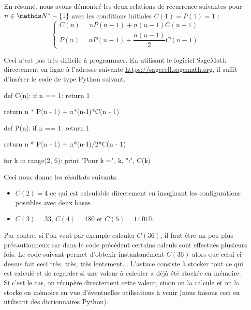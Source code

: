 En résumé, nous avons démontré les deux relations de récurrence suivantes pour $n \in \NN^* - \{1\}$ avec les conditions initiales $C(1) = P(1) = 1$ :
\begin{equation}
	\begin{cases}
		C(n) = n P(n - 1) + n(n-1) C(n-1) \\
		P(n) = n P(n - 1) + \dfrac{n(n-1)}{2} C(n - 1)
	\end{cases}
\end{equation}


\medskip

Ceci n'est pas très difficile à programmer. En utilisant le logiciel SageMath directement en ligne à l'adresse suivante \url{https://sagecell.sagemath.org}, il suffit d'insérer le code de type Python suivant.


\bigskip

\begin{myverb}
def C(n):
    if n == 1:
        return 1
        
    return n * P(n - 1) + n*(n-1)*C(n - 1)


def P(n):
    if n == 1:
        return 1
        
    return n * P(n - 1) + n*(n-1)/2*C(n - 1)

       
for k in range(2, 6):
    print "Pour k =", k, ":", C(k)

\end{myverb}

\bigskip

Ceci nous donne les résultats suivants.

\medskip

\begin{itemize}
    \item[\textbullet] $C(2) = 4$ ce qui est calculable directement en imaginant les configurations possibles avec deux bases.

    \medskip

    \item[\textbullet] $C(3) = 33$,
                       $C(4) = 480$ et
                       $C(5) = 11\,010$.
\end{itemize}


\medskip

Par contre, si l'on veut par exemple calculer $C(36)$, il faut être un peu plus précautionneux car dans le code précédent certains calculs sont effectués plusieurs fois. Le code suivant permet d'obtenir instantanément $C(36)$ alors que celui ci-dessus fait ceci très, très, très lentement... L'astuce consiste à stocker tout ce qui est calculé et de regarder si une valeur à calculer a déjà été stockée en mémoire. Si c'est le cas, on récupère directement cette valeur, sinon on la calcule et on la stocke en mémoire en vue d'éventuelles utilisations à venir (nous faisons ceci  en utilisant des dictionnaires Python).

